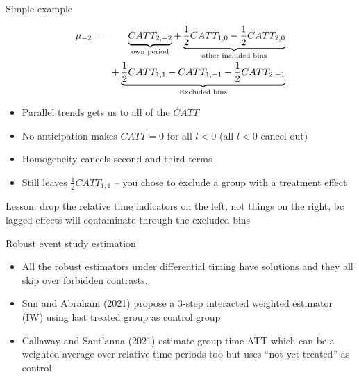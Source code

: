 \documentclass{beamer}
\begin{document}
\begin{frame}{Simple example}

\begin{eqnarray*}
\mu_{-2} &=& \underbrace{CATT_{2,-2}}_{\mathclap{\text{own period}}} + \underbrace{\frac{1}{2}CATT_{1,0} - \frac{1}{2} CATT_{2,0}}_{\mathclap{\text{other included bins}}} \\
&&+ \underbrace{ \frac{1}{2} CATT_{1,1} - CATT_{1,-1} - \frac{1}{2} CATT_{2,-1} }_{\mathclap{\text{Excluded bins}}}
\end{eqnarray*}

\begin{itemize}
\item Parallel trends gets us to all of the $CATT$
\item No anticipation makes $CATT=0$ for all $l<0$ (all $l<0$ cancel out)
\item Homogeneity cancels second and third terms
\item Still leaves $\frac{1}{2} CATT_{1,1}$ -- you chose  to exclude a group with a treatment effect
\end{itemize}Lesson: drop the relative time indicators on the left, not things on the right, bc lagged effects will contaminate through the excluded bins


\end{frame}


\begin{frame}{Robust event study estimation}


\begin{itemize}
\item All the robust estimators under differential timing have solutions and they all skip over forbidden contrasts. 
\item Sun and Abraham (2021) propose a 3-step interacted weighted estimator (IW) using last treated group as control group
\item Callaway and Sant'anna (2021) estimate group-time ATT which can be a weighted average over relative time periods too but uses ``not-yet-treated'' as control
\end{itemize}

\end{frame}
\end{document}
